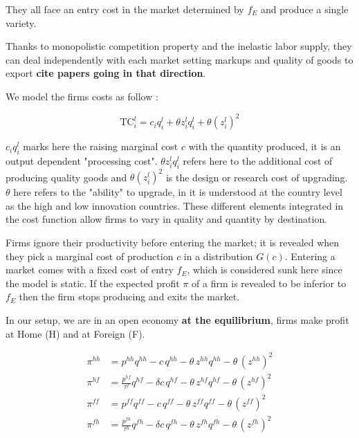 They all face an entry cost in the market determined by $f_E$ and produce a single variety. 

Thanks to monopolistic competition property and the inelastic labor supply, they can deal independently with each market setting markups and quality of goods to export \textbf{cite papers going in that direction}.

We model the firms costs as follow : 

\begin{equation} \label{eq:cost}
    \text{TC}_i^l = c_iq_i^l + \theta z_i^lq_i^l + \theta (z_i^l)^2
\end{equation}

$c_i q_i^l$ marks here the raising marginal cost $c$ with the quantity produced, it is an output dependent "processing cost". $\theta z_i^l q_i^l$ refers here to the additional cost of producing quality goods and $\theta (z_i^l)^2$ is the design or research cost of upgrading. $\theta$ here refers to the "ability" to upgrade, in \citet{antoniadesHeterogeneousFirmsQuality2015} it is understood at the country level as the high and low innovation countries. These different elements integrated in the cost function allow firms to vary in quality and quantity by destination.

Firms ignore their productivity before entering the market; it is revealed when they pick a marginal cost of production $c$ in a distribution $G(c)$. Entering a market comes with a fixed cost of entry $f_E$, which is considered sunk here since the model is static. If the expected profit $\pi$ of a firm is revealed to be inferior to $f_E$ then the firm stops producing and exits the market. 

In our setup, we are in an open economy \textbf{at the equilibrium}, firms make profit at Home (H) and at Foreign (F). 

\begin{equation}
\begin{aligned}
\pi^{hh} &= p^{hh}q^{hh} - c\,q^{hh} - \theta\,z^{hh}q^{hh} - \theta\,(z^{hh})^2 \\
\pi^{hf} &= \frac{p^{hf}}{\tau^f} q^{hf} - \delta c\,q^{hf} - \theta\,z^{hf}q^{hf} - \theta\,(z^{hf})^2 \\
\pi^{ff} &= p^{ff}q^{ff} - c\,q^{ff} - \theta\,z^{ff}q^{ff} - \theta\,(z^{ff})^2 \\
\pi^{fh} &= \frac{p^{fh}}{\tau^h} q^{fh} - \delta c\,q^{fh} - \theta\,z^{fh}q^{fh} - \theta\,(z^{fh})^2
\end{aligned}
\end{equation}

